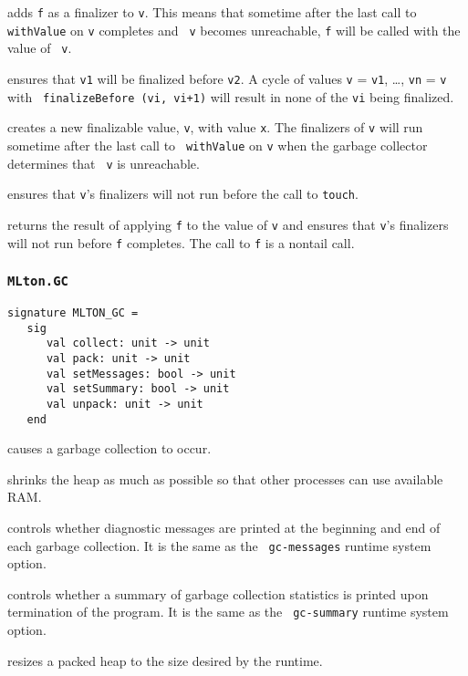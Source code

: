 \begin{description}

adds {\tt f} as a finalizer to {\tt v}.  This means that sometime
after the last call to {\tt withValue} on {\tt v} completes and {\tt
v} becomes unreachable, {\tt f} will be called with the value of {\tt
v}.

ensures that {\tt v1} will be finalized before {\tt v2}.  A cycle of
values {\tt v} = {\tt v1}, \ldots, {\tt vn} = {\tt v} with {\tt
finalizeBefore (vi, vi+1)} will result in none of the {\tt vi} being
finalized.

creates a new finalizable value, {\tt v}, with value {\tt x}.  The
finalizers of {\tt v} will run sometime after the last call to {\tt
withValue} on {\tt v} when the garbage collector determines that {\tt
v} is unreachable.

ensures that {\tt v}'s finalizers will not run before the call to
{\tt touch}.

returns the result of applying {\tt f} to the value of {\tt v} and
ensures that {\tt v}'s finalizers will not run before {\tt f}
completes.  The call to {\tt f} is a nontail call.

\end{description}

\subsubsection{{\tt MLton.GC}}
%
\begin{verbatim}
signature MLTON_GC =
   sig
      val collect: unit -> unit
      val pack: unit -> unit
      val setMessages: bool -> unit
      val setSummary: bool -> unit
      val unpack: unit -> unit
   end
\end{verbatim}

\begin{description}
causes a garbage collection to occur.

shrinks the heap as much as possible so that other processes can use
available RAM.

controls whether diagnostic messages are printed at the beginning and
end of each garbage collection.  It is the same as the {\tt
gc-messages} runtime system option.

controls whether a summary of garbage collection statistics is printed
upon termination of the program.  It is the same as the {\tt
gc-summary} runtime system option.

resizes a packed heap to the size desired by the runtime.

\end{description}
%
